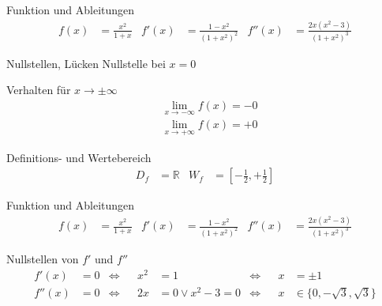 \begin{taskframes}{3.108}

\begin{taskframe}
    \begin{mathbox}{Funktion und Ableitungen}
        \begin{align*}
            f(x) &= \frac{x^2}{1+x} & f'(x) &= \frac{1 - x^2}{(1+x^2)^2} & f''(x) &= \frac{2x(x^2-3)}{(1+x^2)^3}
        \end{align*}
    \end{mathbox}

    \begin{tcbraster}[raster columns=2, raster equal height]
        \begin{textbox}{Nullstellen, Lücken}
            Nullstelle bei $x = 0$
        \end{textbox}
        \begin{mathbox}{Verhalten für $x \to \pm \infty$}
            \begin{align*}
                &\lim_{x \to -\infty} f(x) = -0 \\
                &\lim_{x \to +\infty} f(x) = +0
            \end{align*}
        \end{mathbox}
    \end{tcbraster}
    \begin{mathbox}{Definitions- und Wertebereich}
        \begin{align*}
            D_f &= \mathbb{R} & W_f &= \left[-\frac{1}{2}, +\frac{1}{2}\right]
        \end{align*}
    \end{mathbox}
\end{taskframe}

\begin{taskframe}
    \begin{mathbox}{Funktion und Ableitungen}
        \begin{align*}
            f(x) &= \frac{x^2}{1+x} & f'(x) &= \frac{1 - x^2}{(1+x^2)^2} & f''(x) &= \frac{2x(x^2-3)}{(1+x^2)^3}
        \end{align*}
    \end{mathbox}
    \begin{mathbox}{Nullstellen von $f'$ und $f''$}
        \begin{align*}
            f'(x) &= 0 & \Leftrightarrow && x^2 &= 1 & \Leftrightarrow && x &= \pm 1 \\
            f''(x) &= 0 & \Leftrightarrow && 2x&= 0 \vee x^2-3 = 0 &\Leftrightarrow && x &\in \{0,-\sqrt{3}, \sqrt{3}\}
        \end{align*}
    \end{mathbox}
\end{taskframe}


\end{taskframes}
